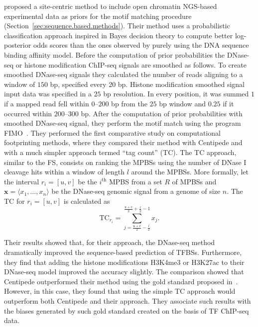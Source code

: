 \cite{cuellar2012} proposed a site-centric method to include open chromatin NGS-based experimental data as priors for the motif matching procedure (Section~\ref{sec:sequence.based.methods}). Their method uses a probabilistic classification approach inspired in Bayes decision theory to compute better log-posterior odds scores than the ones observed by purely using the DNA sequence binding affinity model. Before the computation of prior probabilities the DNase-seq or histone modification ChIP-seq signals are smoothed as follows. To create smoothed DNase-seq signals they calculated the number of reads aligning to a window of $150$ bp, specified every $20$ bp. Histone modification smoothed signal input data was specified in a $25$ bp resolution. In every position, it was summed $ 1 $ if a mapped read fell within $0$--$200$ bp from the $25$ bp window and $ 0.25 $ if it occurred within $200$--$300$ bp. After the computation of prior probabilities with smoothed DNase-seq signal, they perform the motif match using the program FIMO~\citep{grant2011}. They performed the first comparative study on computational footprinting methods, where they compared their method with Centipede and with a much simpler approach termed ``tag count'' (TC). The TC approach, similar to the FS, consists on ranking the MPBSs using the number of DNase I cleavage hits within a window of length $l$ around the MPBSs. More formally, let the interval $r_i = [u, v]$ be the $i^{\text{th}}$ MPBS from a set $R$ of MPBSs and $\mathbf{x} = \langle x_1, ..., x_n\rangle$ be the DNase-seq genomic signal from a genome of size $n$. The TC for $r_i = [u, v]$ is calculated as 
\begin{equation}
  \label{eq:tc}
  \text{TC}_{r_i} = \sum_{j={\frac{u+v}{2}-\frac{l}{2}}}^{\frac{u+v}{2}+\frac{l}{2}-1} {x}_{j}.
\end{equation}

Their results showed that, for their approach, the DNase-seq method dramatically improved the sequence-based prediction of TFBSs. Furthermore, they find that adding the histone modifications H3K4me3 or H3K27ac to their DNase-seq model improved the accuracy slightly. The comparison showed that Centipede outperformed their method using the gold standard proposed in~\cite{pique2011}. However, in this case, they found that using the simple TC approach would outperform both Centipede and their approach. They associate such results with the biases generated by such gold standard created on the basis of TF ChIP-seq data.


